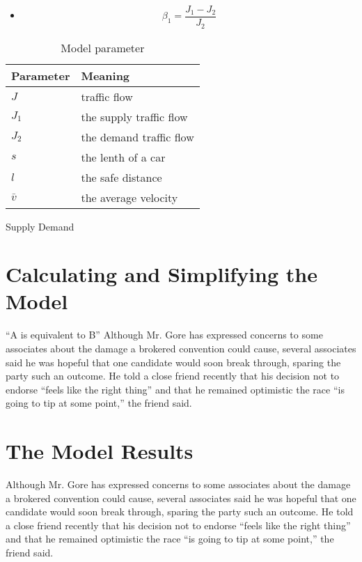 \begin{itemize}
\item 
\begin{displaymath}
\beta_1 = \frac{J_1 - J_2}{J_2}
\end{displaymath}
\end{itemize}

\begin{table}
\centering
\begin{tabular}{ll}
\hline
Parameter & Meaning\\
\hline
$J$ & traffic flow\\
$J_1$ & the supply traffic flow \\
$J_2$ & the demand traffic flow \\
$s$ & the lenth of a car \\
$l$ & the safe distance \\
$\bar{v}$ & the average velocity\\
\hline
\end{tabular}
\caption{Model parameter}
\end{table}
Supply
Demand
\section{Calculating and Simplifying the Model  } ``A is equivalent
to B'' Although Mr. Gore has expressed concerns to some associates
about the damage a brokered convention could cause, several
associates said he was hopeful that one candidate would soon break
through, sparing the party such an outcome. He told a close friend
recently that his decision not to endorse ``feels like the right
thing'' and that he remained optimistic the race ``is going to tip
at some point,'' the friend said.



\section{The Model Results}
Although Mr. Gore has expressed concerns to some associates about
the damage a brokered convention could cause, several associates
said he was hopeful that one candidate would soon break through,
sparing the party such an outcome. He told a close friend recently
that his decision not to endorse ``feels like the right thing''
and that he remained optimistic the race ``is going to tip at some
point,'' the friend said.



